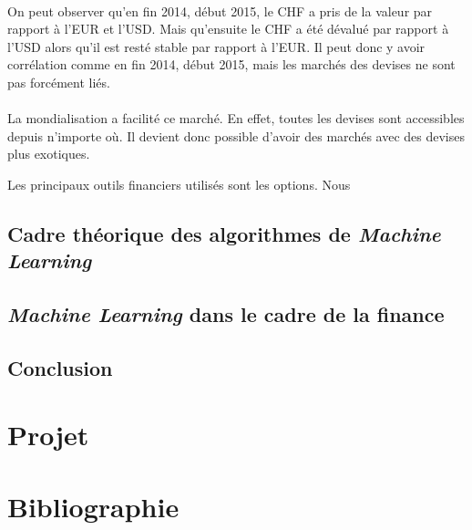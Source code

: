 \documentclass[a4paper, 11pt]{article}
\begin{document}
\paragraph{}
On peut observer qu'en fin 2014, début 2015, le CHF a pris de la valeur par rapport à l'EUR et l'USD. Mais qu'ensuite le CHF a été dévalué par rapport à l'USD alors qu'il est resté stable par rapport à l'EUR.
Il peut donc y avoir corrélation comme en fin 2014, début 2015, mais les marchés des devises ne sont pas forcément liés.

\paragraph{}
La mondialisation a facilité ce marché. En effet, toutes les devises sont accessibles depuis n'importe où. Il devient donc possible d'avoir des marchés avec des devises plus exotiques.

Les principaux outils financiers utilisés sont les options. Nous 

\subsection{Cadre théorique des algorithmes de \textit{Machine Learning}}
\subsection{\textit{Machine Learning} dans le cadre de la finance}
\subsection{Conclusion}
\newpage
\section{Projet}
\newpage
\section{Bibliographie}
\end{document}
